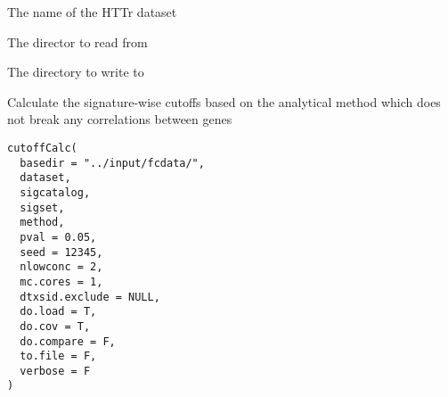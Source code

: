 \documentclass[letterpaper]{book}
\begin{document}
%
\begin{Arguments}
\begin{ldescription}
\item[\code{dataset}] The name of the HTTr dataset

\item[\code{indir}] The director to read from

\item[\code{outdir}] The directory to write to
\end{ldescription}
\end{Arguments}
%
\begin{Description}\relax
Calculate the signature-wise cutoffs based on the analytical method
which does not break any correlations between genes
\end{Description}
%
\begin{Usage}
\begin{verbatim}
cutoffCalc(
  basedir = "../input/fcdata/",
  dataset,
  sigcatalog,
  sigset,
  method,
  pval = 0.05,
  seed = 12345,
  nlowconc = 2,
  mc.cores = 1,
  dtxsid.exclude = NULL,
  do.load = T,
  do.cov = T,
  do.compare = F,
  to.file = F,
  verbose = F
)
\end{verbatim}
\end{Usage}
%
\end{document}
